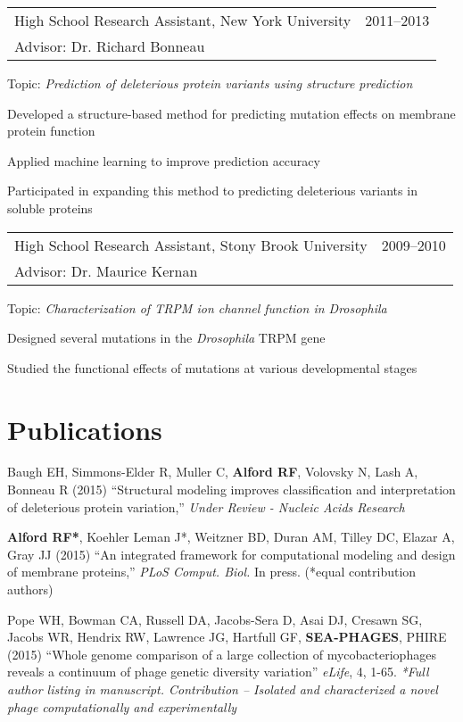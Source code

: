\documentclass[12pt]{article}
\makeatletter
\newcommand{\allcapsspacing}[1]{{\addfontfeature{LetterSpace=7.5}#1}}
\newcommand{\researchitem}[4]{
\noindent
\begin{tabular*}{\textwidth}{@{\extracolsep{\fill}}lr}
		#1 & #2 \\
		#3 & \\
\end{tabular*}\newline#4\vspace{0.25\baselineskip}\par}
\makeatother
\begin{document}
\researchitem{High School Research Assistant, New York University}{2011--2013}{Advisor: Dr. Richard Bonneau}{Topic: \textit{Prediction of deleterious protein variants using structure prediction}}
\begin{compactitem}
\item Developed a structure-based method for predicting mutation effects on membrane protein function
\item Applied machine learning to improve prediction accuracy
\item Participated in expanding this method to predicting deleterious variants in soluble proteins \\
\end{compactitem}

\researchitem{High School Research Assistant, Stony Brook University}{2009--2010}{Advisor: Dr. Maurice Kernan}{Topic: \textit{Characterization of TRPM ion channel function in Drosophila}}
\begin{compactitem}
\item Designed several mutations in the \textit{Drosophila} TRPM gene 
\item Studied the functional effects of mutations at various developmental stages \\
\end{compactitem}

\section*{\allcapsspacing{Publications}}

\begin{etaremune}
\item Baugh EH, Simmons-Elder R, Muller C, \textbf{Alford RF}, Volovsky N, Lash A, Bonneau R (2015) ``Structural modeling improves classification and interpretation of deleterious protein variation,'' \textit{Under Review - Nucleic Acids Research}

\item \textbf{Alford RF*}, Koehler Leman J*, Weitzner BD, Duran AM, Tilley DC, Elazar A, Gray JJ (2015) ``An integrated framework for computational modeling and design of membrane proteins,'' \textit{PLoS Comput. Biol.} In press. (*equal contribution authors)

\item Pope WH, Bowman CA, Russell DA, Jacobs-Sera D, Asai DJ, Cresawn SG, Jacobs WR, Hendrix RW, Lawrence JG, Hartfull GF, \textbf{SEA-PHAGES}, PHIRE (2015) ``Whole genome comparison of a large collection of mycobacteriophages reveals a continuum of phage genetic diversity variation'' \textit{eLife}, 4, 1-65. \textit{*Full author listing in manuscript. Contribution -- Isolated and characterized a novel phage computationally and experimentally}
\end{etaremune}
\end{document}
